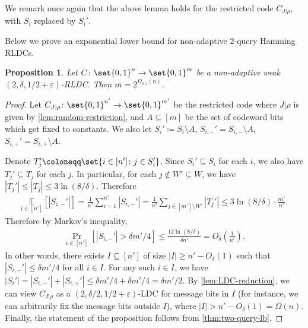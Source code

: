 \documentclass[10pt,a4paper]{article}
\newtheorem{proposition}{Proposition}
\theoremstyle{remark}
\newcommand{\tuple}[1]{\ensuremath{\left(#1\right)}}
\newcommand{\tp}{\tuple}
\newcommand{\eps}{\ensuremath{\varepsilon}}
\begin{document}
We remark once again that the above lemma holds for the restricted code $C_{J|\rho}$, with $S_i$ replaced by $S_i'$.

Below we prove an exponential lower bound for non-adaptive 2-query Hamming RLDCs.
\begin{proposition} \label{prop:non-adaptive-2qRLDC}
	Let $C \colon \set{0,1}^n \rightarrow \set{0,1}^m$ be a non-adaptive weak $(2,\delta,1/2+\eps)$-RLDC. Then $m = 2^{\Omega_{\delta,\eps}(n)}$.
\end{proposition}
\begin{proof}
    Let $C_{J|\rho}\colon \set{0,1}^{n'}\rightarrow \set{0,1}^{m'}$ be the restricted code where $J|\rho$ is given by \cref{lem:random-restriction}, and $A \subseteq [m]$ be the set of codeword bits which get fixed to constants. We also let $S_i'\coloneqq S_i\setminus A$, $S_{i,-}'=S_{i,-}\setminus A$, $S_{i,+}'=S_{i,+}\setminus A$.
    
	Denote $T_j'\coloneqq \set{i \in [n'] \colon j \in S_i'}$. Since $S_i'\subseteq S_i$ for each $i$, we also have $T_j'\subseteq T_j$ for each $j$. In particular, for each $j \notin W' \subseteq W$, we have $|T_j'| \le |T_j| \le 3\ln(8/\delta)$. Therefore
	\begin{align*}
	\underset{i \in [n']}{\mathbb{E}}\left[|S_{i,-}'|\right] = \frac{1}{n'}\sum_{i=1}^{n'}|S_{i,-}'| = \frac{1}{n'}\sum_{j \in [m']\setminus W'}|T_j'| \le 3\ln(8/\delta)\cdot \frac{m'}{n'}.
	\end{align*}
	Therefore by Markov's inequality, 
	\begin{align*}
	\underset{i \in [n']}{\Pr}\left[|S_{i,-}'| > \delta m'/4 \right] \le \frac{12\ln(8/\delta)}{\delta n'} = O_{\delta}\tp{\frac{1}{n'}}.
	\end{align*}
	In other words, there exists $I \subseteq [n']$ of size $|I| \ge n'-O_{\delta}(1)$ such that $|S_{i,-}'| \le \delta m'/4$ for all $i \in I$. For any such $i \in I$, we have $|S_i'| = |S_{i,-}'| + |S_{i,+}'| \le \delta m'/4 + \delta m'/4 = \delta m'/2$. By \cref{lem:LDC-reduction}, we can view $C_{J|\rho}$ as a $(2,\delta/2,1/2+\eps)$-LDC for message bits in $I$ (for instance, we can arbitrarily fix the message bits outside $I$), where $|I| > n'-O_{\delta}(1) = \Omega(n)$. Finally, the statement of the proposition follows from \cref{thm:two-query-lb}. %
\end{proof}
\end{document}
